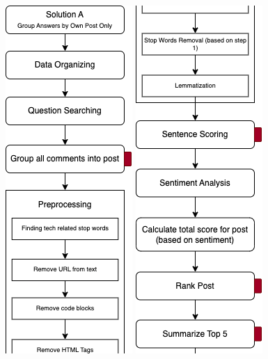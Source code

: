 \pagebreak
\begin{figure}[H] 
  \noindent \includegraphics[scale=1]{slice_solution-a_1.png}
  \noindent \includegraphics[scale=1]{slice_solution-a_2.png}
\end{figure}

